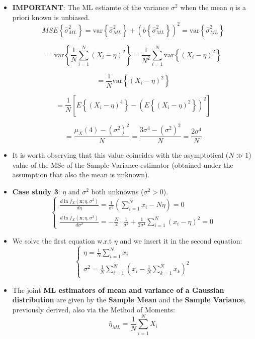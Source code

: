 \begin{itemize}
\[
\frac{d \ln L(\eta, \sigma^2)}{d \sigma^2} = 0
\quad \rightarrow \quad
-\frac{N}{2} \cdot \frac{1}{\sigma^2} + \frac{1}{2 (\sigma^2)^2} \sum_{i=1}^N (x_i - \eta)^2 = 0
\quad \rightarrow \quad
\sigma^2 = \frac{1}{N} \sum_{i=1}^N (x_i - \eta)^2
\]

\[
\hat{\sigma}^2_{ML} = \frac{1}{N} \sum_{i=1}^{N} (X_i - \eta)^2
\]

\[
E\left\{ \hat{\sigma}^2_{ML} \right\}
= E\left\{ \frac{1}{N} \sum_{i=1}^{N} (X_i - \eta)^2 \right\}
= \frac{1}{N} \sum_{i=1}^{N} E\left\{ (X_i - \eta)^2 \right\}
= \sigma^2
\]
    
    \item \textbf{IMPORTANT}: The ML estiamte of the variance \(\sigma^2\) when the mean \(\eta\) is a priori known is unbiased.
    \[
MSE\left\{\hat{\sigma}^2_{ML}\right\}
= \text{var}\left\{\hat{\sigma}^2_{ML}\right\} + \left( b\left\{\hat{\sigma}^2_{ML}\right\} \right)^2
= \text{var}\left\{\hat{\sigma}^2_{ML}\right\}
\]

\[
= \text{var}\left\{
\frac{1}{N} \sum_{i=1}^{N} (X_i - \eta)^2
\right\}
= \frac{1}{N^2} \sum_{i=1}^{N} \text{var}\left\{ (X_i - \eta)^2 \right\}
\]

\[
= \frac{1}{N} \text{var}\left\{ (X_i - \eta)^2 \right\}
\]

\[
= \frac{1}{N} \left[
E\left\{ (X_i - \eta)^4 \right\}
- \left( E\left\{ (X_i - \eta)^2 \right\} \right)^2
\right]
\]

\[
= \frac{\mu_X(4) - (\sigma^2)^2}{N}
= \frac{3\sigma^4 - (\sigma^2)^2}{N}
= \frac{2\sigma^4}{N}
\]
    \item It is worth observing that this value coincides with the asymptotical (\(N\gg 1\)) value of the MSe of the Sample Variance estimator (obtained under the assumption that also the mean is unknown).
    \item \textbf{Case study 3}: \(\eta\) and \(\sigma^2\) both unknowns (\(\sigma^2>0\)).
    \[
\begin{cases}
\displaystyle
\frac{d \ln f_{X}(\mathbf{x}; \eta, \sigma^2)}{d\eta}
= \frac{1}{\sigma^2} \left( \sum_{i=1}^N x_i - N \eta \right) = 0 \\[8pt]
\displaystyle
\frac{d \ln f_{X}(\mathbf{x}; \eta, \sigma^2)}{d\sigma^2}
= -\frac{N}{2} \cdot \frac{1}{\sigma^2}
+ \frac{1}{2\sigma^4} \sum_{i=1}^N (x_i - \eta)^2 = 0
\end{cases}
\]
    \item We solve the first equation w.r.t \(\eta\) and we insert it in the second equation:
    \[
    \begin{cases}
    \displaystyle
    \eta = \frac{1}{N} \sum_{i=1}^{N} x_i \\[8pt]
    \displaystyle
    \sigma^2 = \frac{1}{N} \sum_{i=1}^{N} \left( x_i - \frac{1}{N} \sum_{k=1}^{N} x_k \right)^2
    \end{cases}
    \]
    \item The joint \textbf{ML estimators of mean and variance of a Gaussian distribution} are given by the \textbf{Sample Mean} and the \textbf{Sample Variance}, previously derived, also via the Method of Moments:
    \[
\hat{\eta}_{ML} = \frac{1}{N} \sum_{i=1}^{N} X_i
\]


\end{itemize}
